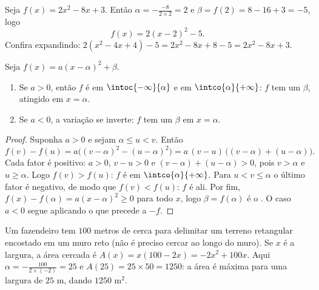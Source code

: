 \begin{example}\label{ex:g11:quad:canonical}
Seja $f(x) = 2x^2 - 8x + 3$. Então $\alpha = -\frac{-8}{2 \times 2} = 2$
e $\beta = f(2) = 8 - 16 + 3 = -5$, logo
\[
f(x) = 2(x - 2)^2 - 5 .
\]
Confira expandindo: $2(x^2 - 4x + 4) - 5 = 2x^2 - 8x + 8 - 5 =
2x^2 - 8x + 3$.
\end{example}

\begin{proposition}\label{prop:g11:quad:variations}
Seja $f(x) = a(x-\alpha)^2 + \beta$.
\begin{enumerate}
  \item Se $a > 0$, então $f$ é  em $\intoc{-\infty}{\alpha}$ e
         em $\intco{\alpha}{+\infty}$: $f$ tem um
        \emph{} $\beta$, atingido em $x = \alpha$.
  \item Se $a < 0$, a variação se inverte: $f$ tem um \emph{}
        $\beta$ em $x = \alpha$.
\end{enumerate}
\end{proposition}

\begin{proof}
Suponha $a > 0$ e sejam $\alpha \leq u < v$. Então
\[
f(v) - f(u) = a\bigl((v-\alpha)^2 - (u-\alpha)^2\bigr)
= a\,(v - u)\,\bigl((v-\alpha) + (u-\alpha)\bigr).
\]
Cada fator é positivo: $a > 0$, $v - u > 0$ e
$(v-\alpha) + (u-\alpha) > 0$, pois $v > \alpha$ e $u \geq \alpha$. Logo
$f(v) > f(u)$: $f$ é  em $\intco{\alpha}{+\infty}$. Para
$u < v \leq \alpha$ o último fator é negativo, de modo que
$f(v) < f(u)$: $f$ é  ali. Por fim,
$f(x) - f(\alpha) = a(x-\alpha)^2 \geq 0$ para todo $x$, logo
$\beta = f(\alpha)$ é o . O caso $a < 0$ segue aplicando o que
precede a $-f$.
\end{proof}

\begin{example}
Um fazendeiro tem $100$ metros de cerca para delimitar um terreno
retangular encostado em um muro reto (não é preciso cercar ao longo do
muro). Se $x$ é a largura, a área cercada é
$A(x) = x(100 - 2x) = -2x^2 + 100x$. Aqui
$\alpha = -\frac{100}{2\times(-2)} = 25$ e
$A(25) = 25 \times 50 = 1250$: a área é máxima para uma largura de
$25$ m, dando $1250$ m$^2$.
\end{example}

